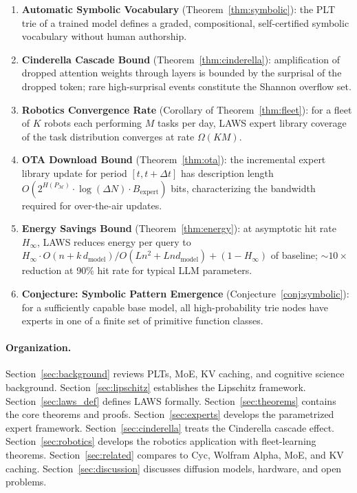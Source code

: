 \documentclass[11pt]{article}
\begin{document}
\begin{enumerate}[leftmargin=2em]
  \item \textbf{Automatic Symbolic Vocabulary} (Theorem~\ref{thm:symbolic}):
        the PLT trie of a trained model defines a graded, compositional,
        self-certified symbolic vocabulary without human authorship.

  \item \textbf{Cinderella Cascade Bound} (Theorem~\ref{thm:cinderella}):
        amplification of dropped attention weights through layers is bounded
        by the surprisal of the dropped token; rare high-surprisal events
        constitute the Shannon overflow set.

  \item \textbf{Robotics Convergence Rate} (Corollary of Theorem~\ref{thm:fleet}):
        for a fleet of $K$ robots each performing $M$ tasks per day,
        LAWS expert library coverage of the task distribution converges
        at rate $\Omega(KM)$.

  \item \textbf{OTA Download Bound} (Theorem~\ref{thm:ota}):
        the incremental expert library update for period $[t, t+\Delta t]$
        has description length $O(2^{H(P_{\mathcal{M}})} \cdot \log(\Delta N) \cdot B_{\mathrm{expert}})$
        bits, characterizing the bandwidth required for over-the-air updates.

  \item \textbf{Energy Savings Bound} (Theorem~\ref{thm:energy}):
        at asymptotic hit rate $H_\infty$, LAWS reduces energy per query to
        $H_\infty \cdot O(n{+}k\,d_{\mathrm{model}})/O(Ln^2{+}Lnd_{\mathrm{model}}) + (1-H_\infty)$ of baseline;
        $\sim 10\times$ reduction at 90\% hit rate for typical LLM parameters.

  \item \textbf{Conjecture: Symbolic Pattern Emergence}
        (Conjecture~\ref{conj:symbolic}):
        for a sufficiently capable base model, all high-probability trie nodes
        have experts in one of a finite set of primitive function classes.
\end{enumerate}

\paragraph{Organization.}
Section~\ref{sec:background} reviews PLTs, MoE, KV caching, and cognitive
science background.  Section~\ref{sec:lipschitz} establishes the Lipschitz
framework.  Section~\ref{sec:laws_def} defines LAWS formally.
Section~\ref{sec:theorems} contains the core theorems and proofs.
Section~\ref{sec:experts} develops the parametrized expert framework.
Section~\ref{sec:cinderella} treats the Cinderella cascade effect.
Section~\ref{sec:robotics} develops the robotics application with
fleet-learning theorems.  Section~\ref{sec:related} compares to Cyc,
Wolfram Alpha, MoE, and KV caching.  Section~\ref{sec:discussion}
discusses diffusion models, hardware, and open problems.
\end{document}
